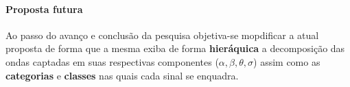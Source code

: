 \begin{frame}
	\framesubtitle{Proposta futura}
	\par Ao passo do avanço e conclusão da pesquisa objetiva-se mopdificar a atual proposta de forma que a mesma exiba de forma \textbf{hieráquica} a decomposição das ondas captadas em suas respectivas componentes ($\alpha, \beta, \theta, \sigma$) assim como as \textbf{categorias} e \textbf{classes} nas quais cada sinal se enquadra.
\end{frame}